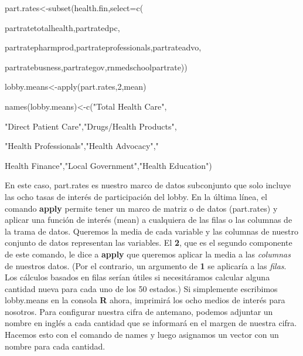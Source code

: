 \documentclass[
]{book}
\newenvironment{Shaded}{\begin{snugshade}}{\end{snugshade}}
\newcommand{\AttributeTok}[1]{\textcolor[rgb]{0.77,0.63,0.00}{#1}}
\newcommand{\DecValTok}[1]{\textcolor[rgb]{0.00,0.00,0.81}{#1}}
\newcommand{\FunctionTok}[1]{\textcolor[rgb]{0.00,0.00,0.00}{#1}}
\newcommand{\NormalTok}[1]{#1}
\newcommand{\OtherTok}[1]{\textcolor[rgb]{0.56,0.35,0.01}{#1}}
\newcommand{\StringTok}[1]{\textcolor[rgb]{0.31,0.60,0.02}{#1}}
\begin{document}
\begin{Shaded}
\begin{Highlighting}[]
\NormalTok{part.rates}\OtherTok{\textless{}{-}}\FunctionTok{subset}\NormalTok{(health.fin,}\AttributeTok{select=}\FunctionTok{c}\NormalTok{(}

\NormalTok{     partratetotalhealth,partratedpc,}

\NormalTok{     partratepharmprod,partrateprofessionals,partrateadvo,}

\NormalTok{     partratebusness,partrategov,rnmedschoolpartrate))}

\NormalTok{lobby.means}\OtherTok{\textless{}{-}}\FunctionTok{apply}\NormalTok{(part.rates,}\DecValTok{2}\NormalTok{,mean)}

\FunctionTok{names}\NormalTok{(lobby.means)}\OtherTok{\textless{}{-}}\FunctionTok{c}\NormalTok{(}\StringTok{"Total Health Care"}\NormalTok{,}

     \StringTok{"Direct Patient Care"}\NormalTok{,}\StringTok{"Drugs/Health Products"}\NormalTok{,}

     \StringTok{"Health Professionals"}\NormalTok{,}\StringTok{"Health Advocacy"}\NormalTok{,}\StringTok{"}

\StringTok{     Health Finance"}\NormalTok{,}\StringTok{"Local Government"}\NormalTok{,}\StringTok{"Health Education"}\NormalTok{)}
\end{Highlighting}
\end{Shaded}

En este caso, part.rates es nuestro marco de datos subconjunto que solo incluye las ocho tasas de interés de participación del lobby. En la última línea, el comando \textbf{apply} permite tener un marco de matriz o de datos (part.rates) y aplicar una función de interés (mean) a cualquiera de las filas o las columnas de la trama de datos. Queremos la media de cada variable y las columnas de nuestro conjunto de datos representan las variables. El \textbf{2}, que es el segundo componente de este comando, le dice a \textbf{apply} que queremos aplicar la media a las \emph{columnas} de nuestros datos. (Por el contrario, un argumento de \textbf{1} se aplicaría a las \emph{filas}. Los cálculos basados \hspace{0pt}\hspace{0pt}en filas serían útiles si necesitáramos calcular alguna cantidad nueva para cada uno de los 50 estados.) Si simplemente escribimos lobby.means en la consola \textbf{R} ahora, imprimirá los ocho medios de interés para nosotros. Para configurar nuestra cifra de antemano, podemos adjuntar un nombre en inglés a cada cantidad que se informará en el margen de nuestra cifra. Hacemos esto con el comando de names y luego asignamos un vector con un nombre para cada cantidad.
\end{document}
